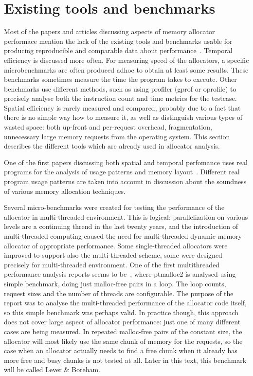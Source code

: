 \section{Existing tools and benchmarks}
Most of the papers and articles discussing aspects of memory allocator performace mention the lack of the existing tools and benchmarks usable for producing reproducible and comparable data about performance~\cite{onemalloc,dalsi}. Temporal efficiency is discussed more often. For measuring speed of the allocators, a specific micro\-benchmarks are often produced ad\-hoc to obtain at least some results. These benchmarks sometimes measure the time the program takes to execute. Other benchmarks use different methods, such as using profiler (gprof or oprofile) to precisely analyse both the instruction count and time metrics for the testcase. Spatial efficiency is rarely measured and compared, probably due to a fact that there is no simple way how to measure it, as well as distinguish various types of wasted space: both up-front and per-request overhead, fragmentation, unnecessary large memory requests from the operating system. This section describes the different tools which are already used in allocator analysis.

One of the first papers discussing both spatial and temporal perfomance uses real programs for the analysis of usage patterns and memory layout~\cite{DSAsurvey}. Different real program usage patterns are taken into account in discussion about the soundness of various memory allocation techniques.

Several micro-benchmarks were created for testing the performance of the allocator in multi-threaded environment. This is logical: parallelization on various levels are a continuing thrend in the last twenty years, and the introduction of multi-threaded computing caused the need for multi-threaded dynamic memory allocator of appropriate performance. Some single-threaded allocators were improved to support also the multi-threaded scheme, some were designed precisely for multi-threaded environment. One of the first multithreaded performance analysis reports seems to be~\cite{scalability}, where ptmalloc2 is analysed using simple benchmark, doing just malloc-free pairs in a loop. The loop counts, request sizes and the number of threads are configurable. The purpose of the report was to analyse the multi-threaded performance of the allocator code itself, so this simple benchmark was perhaps valid. In practice though, this approach does not cover large aspect of allocator performance: just one of many different cases are being measured. In repeated malloc-free pairs of the constant size, the allocator will most likely use the same chunk of memory for the requests, so the case when an allocator actually needs to find a free chunk when it already has more free and busy chunks is not tested at all. Later in this text, this benchmark will be called Lever \& Boreham.


